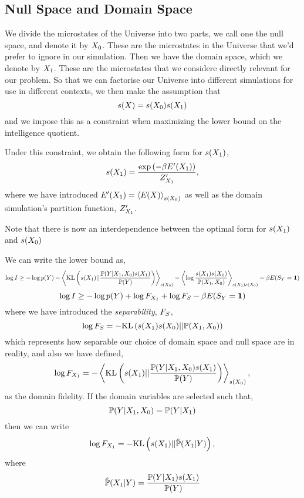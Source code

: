 \documentclass[]{article}
\begin{document}
\subsection{Null Space and Domain Space}

We divide the microstates of the Universe into two parts, we call one the null space, and denote it by ${X_0}$. These are the microstates in the Universe that we'd prefer to ignore in our simulation. Then we have the domain space, which we denote by ${X_1}$. These are the microstates that we considere directly relevant for our problem. So that we can factorise our Universe into different simulations for use in different contexts, we then make the assumption that
\[
s(X) = s({X_0}) s({X_1})
\]
and we impose this as a constraint when maximizing the lower bound on the intelligence quotient.

Under this constraint, we obtain the following form for $s({X_1})$,
\[
s({X_1}) = \frac{\exp \left(-\beta E^\prime({X_1})\right)}{Z^\prime_{X_1}},
\]
where we have introduced $E^\prime({X_1}) = \left\langle E(X) \right\rangle_{s({X_0})}$ as well as the domain simulation's partition function, $Z^\prime_{X_1}$.

Note that there is now an interdependence between the optimal form for $s({X_1})$ and $s({X_0})$

We can write the lower bound as,
$$
\log I \geq -\log p(Y) - \left\langle \text{KL}\left(s({X_1}) || \frac{\mathbb{P}(Y | {X_1},{X_0})s({X_1})}{\mathbb{P}(Y)}\right) \right\rangle_{s({X_0})}  - \left\langle \log \frac{s({X_1})s({X_0})}{\mathbb{P}({X_1},{X_0})} \right\rangle_{s({X_1})s({X_0})}  -\beta E(S_Y=\textbf{1})
$$
$$
\log I \geq -\log p(Y) + \log F_{X_1}  + \log {F_S}  -\beta E(S_Y=\textbf{1})
$$
where we have introduced the \emph{separability}, ${F_S}$,
$$
\log {F_S} = - \text{KL}\left(s({X_1})s({X_0})||\mathbb{P}({X_1},{X_0})\right)
$$
which represents how separable our choice of domain space and null space are in reality,
and also we have defined,
$$
\log F_{X_1} = - \left\langle \text{KL}\left(s({X_1}) || \frac{\mathbb{P}(Y | {X_1},{X_0})s({X_1})}{\mathbb{P}(Y)}\right) \right\rangle_{s({X_0})},
$$
as the domain fidelity. If the domain variables are selected such that,
$$
\mathbb{P}(Y | {X_1}, {X_0}) = \mathbb{P}(Y |{X_1})
$$
then we can write
$$
\log F_{X_1} = - \text{KL}\left(s({X_1}) || \hat{\mathbb{P}}({X_1} | Y) \right),
$$
where
$$
\hat{\mathbb{P}}({X_1} | Y) = \frac{\mathbb{P}(Y | {X_1})s({X_1})}{\mathbb{P}(Y)}
$$
\end{document}

